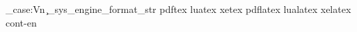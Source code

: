 
\ExplSyntaxOn
\str_case:Vn
  \c_sys_engine_format_str
  {
    { pdftex   } { \def \file { example.plaintex } }
    { luatex   } { \def \file { example.plaintex } }
    { xetex    } { \def \file { example.plaintex } }
    { pdflatex } { \def \file { example.latex    } }
    { lualatex } { \def \file { example.latex    } }
    { xelatex  } { \def \file { example.latex    } }
    { cont-en  } { \def \file { example.context  } }
  }
\ExplSyntaxOff
\file\relax
